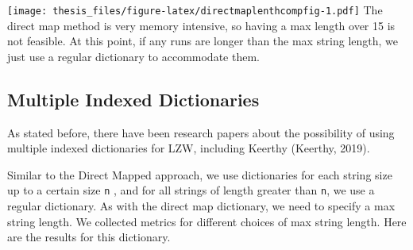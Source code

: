 \documentclass[12pt,twoside]{reedthesis}
\begin{document}
\texttt{[image: thesis\_files/figure-latex/directmaplenthcompfig-1.pdf]}
The direct map method is very memory intensive, so having a max length over 15 is not feasible. At this point, if any runs are longer than the max string length, we just use a regular dictionary to accommodate them.

\hypertarget{multiple-indexed-dictionaries}{%
\subsection{Multiple Indexed Dictionaries}\label{multiple-indexed-dictionaries}}

As stated before, there have been research papers about the possibility of using multiple indexed dictionaries for LZW, including Keerthy (Keerthy, 2019).

Similar to the Direct Mapped approach, we use dictionaries for each string size up to a certain size \texttt{n} , and for all strings of length greater than \texttt{n}, we use a regular dictionary. As with the direct map dictionary, we need to specify a max string length. We collected metrics for different choices of max string length. Here are the results for this dictionary.
\end{document}
